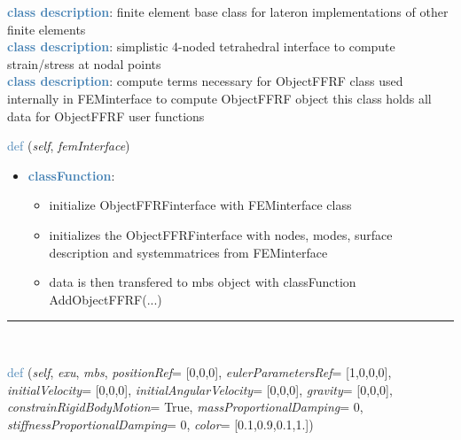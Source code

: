 \begin{itemize}[leftmargin=1.4cm]
\begin{itemize}[leftmargin=1.4cm]
\begin{itemize}[leftmargin=1.4cm]
\begin{itemize}[leftmargin=0.5cm]
\begin{itemize}[leftmargin=1.4cm]
\begin{itemize}[leftmargin=1.4cm]
\begin{itemize}[leftmargin=1.4cm]
\begin{itemize}[leftmargin=0.5cm]
%
\noindent\textcolor{steelblue}{{\bf class description}}:  finite element base class for lateron implementations of other finite elements
\vspace{3pt} \\ 
\noindent\textcolor{steelblue}{{\bf class description}}:  simplistic 4-noded tetrahedral interface to compute strain/stress at nodal points
\vspace{3pt} \\ 
\noindent\textcolor{steelblue}{{\bf class description}}:  compute terms necessary for ObjectFFRF
class used internally in FEMinterface to compute ObjectFFRF object
this class holds all data for ObjectFFRF user functions
\vspace{3pt} \\ 
\begin{flushleft}
\noindent \textcolor{steelblue}{def {\bf {}}}\label{sec:FEM:ObjectFFRFinterface:__init__}
({\it self}, {\it femInterface})
\end{flushleft}
\setlength{\itemindent}{0.7cm}
\begin{itemize}[leftmargin=0.7cm]
\item[--]\textcolor{steelblue}{\bf classFunction}: \vspace{-6pt}
\begin{itemize}[leftmargin=1.2cm]
\setlength{\itemindent}{-0.7cm}
\item[]initialize ObjectFFRFinterface with FEMinterface class
\item[]initializes the ObjectFFRFinterface with nodes, modes, surface description and systemmatrices from FEMinterface
\item[]data is then transfered to mbs object with classFunction AddObjectFFRF(...)
\end{itemize}
\vspace{12pt}\end{itemize}
%
\noindent\rule{8cm}{0.75pt}\vspace{1pt} \\ 
\begin{flushleft}
\noindent \textcolor{steelblue}{def {\bf {}}}\label{sec:FEM:ObjectFFRFinterface:AddObjectFFRF}
({\it self}, {\it exu}, {\it mbs}, {\it positionRef}= [0,0,0], {\it eulerParametersRef}= [1,0,0,0], {\it initialVelocity}= [0,0,0], {\it initialAngularVelocity}= [0,0,0], {\it gravity}= [0,0,0], {\it constrainRigidBodyMotion}= True, {\it massProportionalDamping}= 0, {\it stiffnessProportionalDamping}= 0, {\it color}= [0.1,0.9,0.1,1.])

\end{flushleft}
\end{itemize}
\end{itemize}
\end{itemize}
\end{itemize}
\end{itemize}
\end{itemize}
\end{itemize}
\end{itemize}

